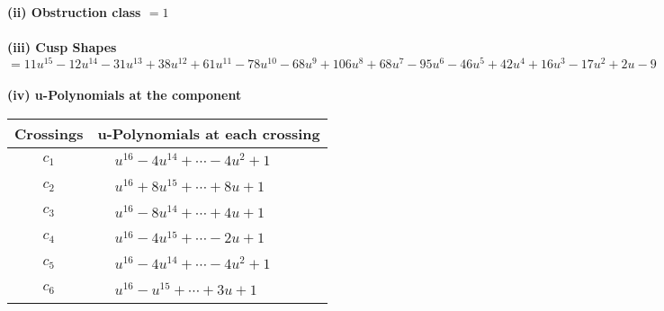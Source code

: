 \documentclass[1p]{elsarticle_modified}
\theoremstyle{definition}
\begin{document}
\flushleft \textbf{(ii) Obstruction class $= 1$}\\~\\
\flushleft \textbf{(iii) Cusp Shapes $= 11 u^{15}-12 u^{14}-31 u^{13}+38 u^{12}+61 u^{11}-78 u^{10}-68 u^9+106 u^8+68 u^7-95 u^6-46 u^5+42 u^4+16 u^3-17 u^2+2 u-9$}\\~\\
\newpage\renewcommand{\arraystretch}{1}
\flushleft \textbf{(iv) u-Polynomials at the component}\newline \\
\begin{tabular}{m{50pt}|m{274pt}}
Crossings & \hspace{64pt}u-Polynomials at each crossing \\
\hline $$\begin{aligned}c_{1}\end{aligned}$$&$\begin{aligned}
&u^{16}-4 u^{14}+\cdots-4 u^2+1
\end{aligned}$\\
\hline $$\begin{aligned}c_{2}\end{aligned}$$&$\begin{aligned}
&u^{16}+8 u^{15}+\cdots+8 u+1
\end{aligned}$\\
\hline $$\begin{aligned}c_{3}\end{aligned}$$&$\begin{aligned}
&u^{16}-8 u^{14}+\cdots+4 u+1
\end{aligned}$\\
\hline $$\begin{aligned}c_{4}\end{aligned}$$&$\begin{aligned}
&u^{16}-4 u^{15}+\cdots-2 u+1
\end{aligned}$\\
\hline $$\begin{aligned}c_{5}\end{aligned}$$&$\begin{aligned}
&u^{16}-4 u^{14}+\cdots-4 u^2+1
\end{aligned}$\\
\hline $$\begin{aligned}c_{6}\end{aligned}$$&$\begin{aligned}
&u^{16}- u^{15}+\cdots+3 u+1
\end{aligned}$\\

\end{tabular}
\end{document}
